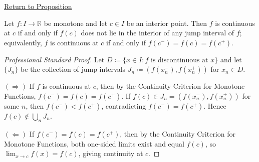 \newpage
{}
\label{prf:criterion-continuity-monotone}

\begin{remark*}[Return]
\hyperref[prop:criterion-continuity-monotone]{Return to Proposition}
\end{remark*}

\begin{theorem*}
Let $f : I \to \mathbb{R}$ be monotone and let $c \in I$ be an interior point. Then $f$ is continuous at $c$ if and only if $f(c)$ does not lie in the interior of any jump interval of $f$; equivalently, $f$ is continuous at $c$ if and only if $f(c^{-}) = f(c) = f(c^{+})$.
\end{theorem*}

\begin{proof}[Professional Standard Proof]
\LRAProofBodyStart
Let $D \coloneqq \{x \in I : f \text{ is discontinuous at } x\}$ and let $\{J_n\}$ be the collection of jump intervals $J_n \coloneqq (f(x_n^{-}), f(x_n^{+}))$ for $x_n \in D$.

$(\Rightarrow)$ If $f$ is continuous at $c$, then by the Continuity Criterion for Monotone Functions, $f(c^{-}) = f(c) = f(c^{+})$. If $f(c) \in J_n = (f(x_n^{-}), f(x_n^{+}))$ for some $n$, then $f(c^{-}) < f(c^{+})$, contradicting $f(c^{-}) = f(c^{+})$. Hence $f(c) \notin \bigcup_n J_n$.

$(\Leftarrow)$ If $f(c^{-}) = f(c) = f(c^{+})$, then by the Continuity Criterion for Monotone Functions, both one-sided limits exist and equal $f(c)$, so $\lim_{x \to c} f(x) = f(c)$, giving continuity at $c$.
\end{proof}

